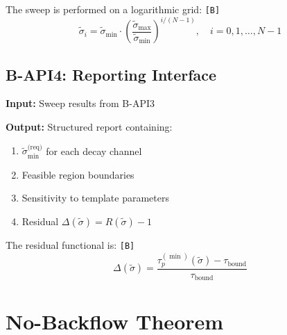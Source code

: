 \documentclass[11pt,a4paper]{article}
\newcommand{\tagB}{\textcolor{purple!70!black}{\texttt{[B]}}}
\theoremstyle{definition}
\begin{document}
The sweep is performed on a logarithmic grid: \tagB{}
\begin{equation}
\label{eq:log-grid}
\tilde{\sigma}_i = \tilde{\sigma}_{\min} \cdot \left(\frac{\tilde{\sigma}_{\max}}{\tilde{\sigma}_{\min}}\right)^{i/(N-1)}, \quad i = 0, 1, \ldots, N-1
\end{equation}

\subsection{B-API4: Reporting Interface}
\label{subsec:b-api4}

\begin{apibox}
\textbf{Input:} Sweep results from B-API3

\textbf{Output:} Structured report containing:
\begin{enumerate}
  \item $\tilde{\sigma}_{\min}^{\text{(req)}}$ for each decay channel
  \item Feasible region boundaries
  \item Sensitivity to template parameters
  \item Residual $\Delta(\tilde{\sigma}) = R(\tilde{\sigma}) - 1$
\end{enumerate}
\end{apibox}

The residual functional is: \tagB{}
\begin{equation}
\label{eq:residual}
\Delta(\tilde{\sigma}) = \frac{\tau_p^{(\min)}(\tilde{\sigma}) - \tau_{\text{bound}}}{\tau_{\text{bound}}}
\end{equation}

\section{No-Backflow Theorem}
\label{sec:no-backflow}
\end{document}
